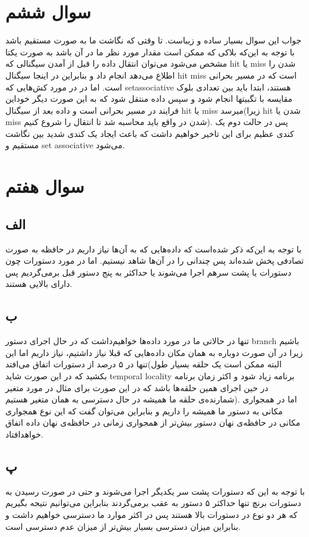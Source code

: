 \documentclass[11pt]{article}
\begin{document}
\section{سوال ششم}
جواب این سوال بسیار ساده و زیباست. تا وقتی که نگاشت ما به صورت مستقیم باشد با توجه به این‌که بلاکی که ممکن است مقدار مورد نظر ما در آن باشد به صورت یکتا مشخص می‌شود می‌توان انتقال داده را قبل از آمدن سیگنالی که hit یا miss شدن را اطلاع می‌دهد انجام داد و بنابراین در اینجا سیگنال hit miss است که در مسیر بحرانی است. اما در در مورد کش‌هایی که setassociative هستند، ابتدا باید بین تعدادی بلوک مقایسه با تگبیتها انجام شود و سپس داده منتقل شود که به این صورت دیگر خوداین فرایند در مسیر بحرانی است و داده بعد از سیگنال hit یا miss میرسد(زیرا hit شدن یا miss شدن در واقع باید محاسبه شد تا انتقال را شروع کنیم). پس در حالت دوم یک کندی عظیم برای این تاخیر خواهیم داشت که باعث ایجاد یک کندی شدید بین نگاشت  مستقیم و set associative می‌شود.
\section{سوال هفتم}
\subsection{الف}
با توجه به این‌که ذکر شده‌است که داده‌هایی که به آن‌ها نیاز داریم در حافظه به صورت تصادفی پخش‌ شده‌اند پس 
چندانی را در آن‌ها شاهد نیستیم.
اما در مورد دستورات چون دستورات یا پشت سر‌هم اجرا می‌شوند یا حداکثر به پنج دستور قبل برمی‌گردیم پس دارای
بالایی هستند.
\subsection{ب}
تنها در حالاتی ما 
در مورد داده‌ها خواهیم‌داشت که در حال اجرای دستور branch باشیم زیرا در آن صورت دوباره به همان مکان داده‌هایی که قبلا نیاز داشتیم، نیاز داریم اما این تنها در ۵ درصد از دستورات اتفاق می‌افتد(البته ممکن است یک حلقه بسیار طول بکشید که در این صورت شاید temporal locality برنامه زیاد شود و اکثر زمان برنامه در حین اجرای همین حلقه‌ها باشد که در این صورت برای مثال در مورد متغیر شمارنده‌ی حلقه ما همیشه در حال دسترسی به همان متغیر هستیم).
\newline
اما در همجواری مکانی به دستور ما همیشه 
را داریم و بنابراین می‌توان گفت که این نوع همجواری مکانی در حافظه‌ی نهان دستور بیش‌تر از همجواری زمانی
در حافظه‌ی نهان داده اتفاق خواهد‌افتاد.
\subsection{پ}
با توجه به این که دستورات پشت سر یکدیگر اجرا می‌شوند و حتی در صورت رسیدن به دستورات برنچ تنها حداکثر ۵ دستور به عقب برمی‌گردند بنابراین می‌توانیم نتیجه بگیریم که هر دو نوع
در دستورات بالا هستند پس در اکثر موارد ما دسترسی خواهیم داشت و بنابراین میزان دسترسی بسیار بیش‌تر از میزان عدم دسترسی است.
\end{document}

